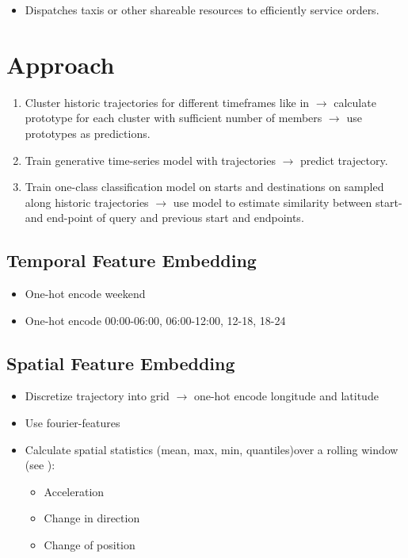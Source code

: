 \documentclass{article} %
\begin{document}
\begin{itemize}
    \item Dispatches taxis or other shareable resources to efficiently service orders.
\end{itemize}

\section{Approach}

\begin{enumerate}
    \item Cluster historic trajectories for different timeframes like in \citet{yaoTrajectoryClusteringDeep2017a} $\rightarrow$ calculate prototype for each cluster with sufficient number of members $\rightarrow$ use prototypes as predictions.
    \item Train generative time-series model with trajectories $\rightarrow$ predict trajectory.
    \item Train one-class classification model on starts and destinations on sampled along historic trajectories $\rightarrow$ use model to estimate similarity between start- and end-point of query and previous start and endpoints.
\end{enumerate}

\subsection{Temporal Feature Embedding}

\begin{itemize}
    \item One-hot encode weekend
    \item One-hot encode 00:00-06:00, 06:00-12:00, 12-18, 18-24
\end{itemize}

\subsection{Spatial Feature Embedding}

\begin{itemize}
    \item Discretize trajectory into grid $\rightarrow$ one-hot encode longitude and latitude
    \item Use fourier-features
    \item Calculate spatial statistics (mean, max, min, quantiles)over a rolling window (see \cite{yaoTrajectoryClusteringDeep2017a}):
          \begin{itemize}
              \item Acceleration
              \item Change in direction
              \item Change of position
          \end{itemize}
\end{itemize}
\end{document}
